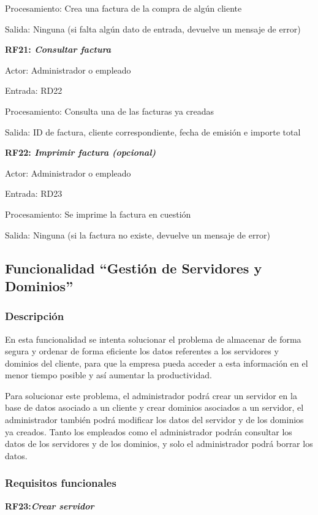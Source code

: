 \documentclass[paper=a4, fontsize=11pt, spanish]{scrartcl}
\begin{document}
	Procesamiento: Crea una factura de la compra de algún cliente 
	
	Salida: Ninguna (si falta algún dato de entrada, devuelve un mensaje de error)
	
	\setlength{\parindent}{0em}
	\textbf{RF21: \textit{Consultar factura}}
	\setlength{\parindent}{2em}
	
	Actor: Administrador o empleado
	
	Entrada: RD22
	
	Procesamiento: Consulta una de las facturas ya creadas 
	
	Salida: ID de factura, cliente correspondiente, fecha de emisión e importe total
	
	\setlength{\parindent}{0em}
	\textbf{RF22: \textit{Imprimir factura (opcional)}}
	\setlength{\parindent}{2em}
	
	Actor: Administrador o empleado
	
	Entrada: RD23
	
	Procesamiento: Se imprime la factura en cuestión
	
	Salida: Ninguna (si la factura no existe, devuelve un mensaje de error)
    
\subsection{Funcionalidad “Gestión de Servidores y Dominios”}

\subsubsection{Descripción}
\setlength{\parindent}{3em} En esta funcionalidad se intenta solucionar el problema de almacenar de forma segura y ordenar de forma eficiente los datos referentes a los servidores y dominios del cliente, para que la empresa pueda acceder a esta información en el menor tiempo posible y así aumentar la productividad. 

Para solucionar este problema, el administrador podrá crear un servidor en la base de datos asociado a un cliente y crear dominios asociados a un servidor, el administrador también podrá modificar los datos del servidor y de los dominios ya creados. Tanto los empleados como el administrador podrán consultar los datos de los servidores y de los dominios, y solo el administrador podrá borrar los datos.

\subsubsection{Requisitos funcionales}
\setlength{\parindent}{0em}
\textbf{RF23:\textit{Crear servidor}}
\setlength{\parindent}{3em}
\end{document}
